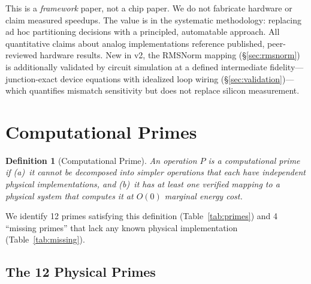 \documentclass[11pt]{article}
\newtheorem{definition}{Definition}
\begin{document}
This is a \textit{framework} paper, not a chip paper. We do not fabricate hardware or claim measured speedups. The value is in the systematic methodology: replacing ad hoc partitioning decisions with a principled, automatable approach. All quantitative claims about analog implementations reference published, peer-reviewed hardware results. New in v2, the RMSNorm mapping (\S\ref{sec:rmsnorm}) is additionally validated by circuit simulation at a defined intermediate fidelity---junction-exact device equations with idealized loop wiring (\S\ref{sec:validation})---which quantifies mismatch sensitivity but does not replace silicon measurement.

\section{Computational Primes}
\label{sec:primes}

\begin{definition}[Computational Prime]
An operation $P$ is a computational prime if (a)~it cannot be decomposed into simpler operations that each have independent physical implementations, and (b)~it has at least one verified mapping to a physical system that computes it at $O(0)$ marginal energy cost.
\end{definition}

We identify 12 primes satisfying this definition (Table~\ref{tab:primes}) and 4 ``missing primes'' that lack any known physical implementation (Table~\ref{tab:missing}).

\subsection{The 12 Physical Primes}
\end{document}
